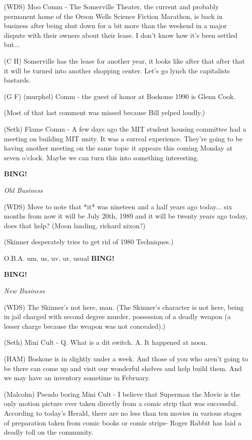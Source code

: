 \documentclass[12pt]{article}
\newcommand{\bing}{{\bf BING!} }
\newcommand{\goto}[1]{\bing \vskip 12pt \centerline{{\em{#1}}}}
\begin{document}
(WDS) Moo Comm - The Somerville Theater, the current and probably permanent home of the Orson Wells Science Fiction Marathon, is back in business after being shut down for a bit more than the weekend in a major dispute with their owners about their lease. I don't know how it's been settled but...

(C H) Somerville has the lease for another year, it looks like after that after that it will be turned into another shopping center. Let's go lynch the capitalists bastards.

(G F) (murphel) Comm - the guest of honor at Boskome 1990 is Glenn Cook.

(Most of that last comment was missed because Bill yelped loudly.)

(Seth) Flame Comm - A few days ago the MIT student housing committee had a meeting on building MIT unity. It was a surreal experience. They're going to be having another meeting on the same topic it appears this coming Monday at seven o'clock.  Maybe we can turn this into something interesting.

\goto{Old Business}

(WDS) Move to note that *it* was nineteen and a half years ago today...  six months from now it will be July 20th, 1989 and it will be twenty years ago today, does that help? (Moon landing, richard
nixon?)

(Skinner desperately tries to get rid of 1980 Techniques.)

O.B.A. um, us, uv, ur, usual \bing

\goto{New Business}

(WDS) The Skinner's not here, man. (The Skinner's character is not here, being in jail charged with second degree murder, possession of a deadly weapon (a lesser charge because the weapon was not concealed).)

(Seth) Mini Cult - Q. What is a dit switch. A. It happened at noon.

(HAM) Boskone is in slightly under a week.  And those of you who aren't going to be there can come up and visit our wonderful shelves and help build them. And we may have an inventory sometime in
February.  

(Malcolm) Pseudo boring Mini Cult - I believe that Superman the Movie is the only motion picture ever taken directly from a comic strip that was successful. According to today's Herald, there are no less than ten movies in various stages of preparation taken from comic books or comic strips- Roger Rabbit has laid a deadly toll on the
community.
\end{document}
